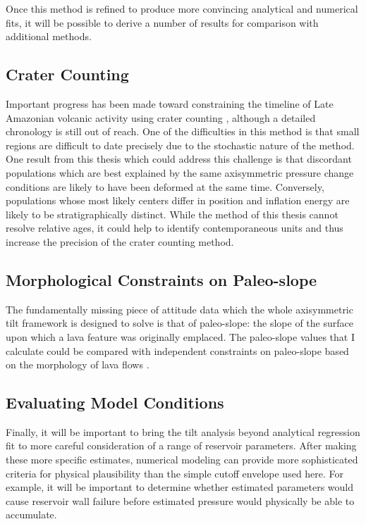 Once this method is refined to produce more convincing analytical and numerical fits, it will be possible to derive a number of results for comparison with additional methods.

\subsection{Crater Counting}
Important progress has been made toward constraining the timeline of Late Amazonian volcanic activity using crater counting \parencite{kneissl_map-projection-independent_2011,robbins_volcanic_2011,
robbins_large_2013,
platz_crater-based_2013}, although a detailed chronology is still out of reach. One of the difficulties in this method is that small regions are difficult to date precisely due to the stochastic nature of the method. One result from this thesis which could address this challenge is that discordant populations which are best explained by the same axisymmetric pressure change conditions are likely to have been deformed at the same time. Conversely, populations whose most likely centers differ in position and inflation energy are likely to be stratigraphically distinct. While the method of this thesis cannot resolve relative ages, it could help to identify contemporaneous units and thus increase the precision of the crater counting method.

\subsection{Morphological Constraints on Paleo-slope}

The fundamentally missing piece of attitude data which the whole axisymmetric tilt framework is designed to solve is that of paleo-slope: the slope of the surface upon which a lava feature was originally emplaced. The paleo-slope values that I calculate could be compared with independent constraints on paleo-slope based on the morphology of lava flows \parencite{wadge_lobes_1991, peitersen_correlations_2000, peters_lava_2021}.

\subsection{Evaluating Model Conditions}

Finally, it will be important to bring the tilt analysis beyond analytical regression fit to more careful consideration of a range of reservoir parameters. After making these more specific estimates, numerical modeling can provide more sophisticated criteria for physical plausibility than the simple cutoff envelope used here. For example, it will be important to determine whether estimated parameters would cause reservoir wall failure before estimated pressure would physically be able to accumulate. 